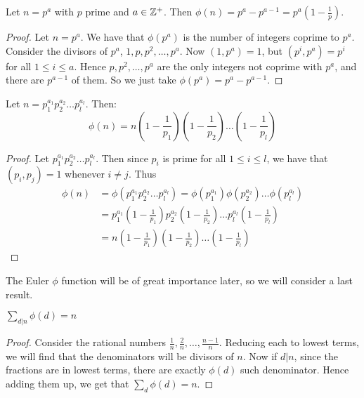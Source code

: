 \begin{lemma}\label{lemma2.2.16}
    Let $n=p^a$ with $p$ prime and $a \in \mathbb{Z}^+$. Then $\phi(n)=p^a-p^{a-1}=p^a(1-\frac{1}{p})$.
\end{lemma}
\begin{proof}
    Let $n=p^a$. We have that $\phi(p^a)$ is the number of integers coprime to $p^a$. Consider the divisors of $p^a$, $1,p,p^2, \dots, p^a$. Now $(1,p^a)=1$, but $(p^i,p^a)=p^i$ for all $1 \leq i \leq a$. Hence $p,p^2, \dots, p^a$ are the only integers not coprime with $p^a$, and there are $p^{a-1}$ of them. So we just take $\phi(p^a)=p^a-p^{a-1}$.
\end{proof}

\begin{proposition}\label{proposition2.2.17}
    Let $n=p_1^{a_1}p_2^{a_2} \dots p_l^{a_l}$. Then:
        \begin{equation}
            \phi(n)=n(1-\frac{1}{p_1})(1-\frac{1}{p_2}) \dots (1-\frac{1}{p_l})
        \end{equation}
\end{proposition}
\begin{proof}
    Let $p_1^{a_1}p_2^{a_2} \dots p_l^{a_l}$. Then since $p_i$ is prime for all $1 \leq i \leq l$, we have that $(p_i,p_j)=1$ whenever $i \neq j$. Thus
        \begin{align*}
            \phi(n) &= \phi(p_1^{a_1}p_2^{a_2} \dots p_l^{a_l})=\phi(p_1^{a_1})\phi(p_2^{a_2}) \dots \phi(p_l^{a_l}) \\
                    &= p_1^{a_1}(1-\frac{1}{p_1})p_2^{a_2}(1-\frac{1}{p_2}) \dots p_l^{a_l}(1-\frac{1}{p_l}) \\
                    &=n(1-\frac{1}{p_1})(1-\frac{1}{p_2}) \dots (1-\frac{1}{p_l})
        \end{align*}
\end{proof}

The Euler $\phi$ function will be of great importance later, so we will consider a last result.

\begin{proposition}\label{proposition2.2.18}
    $\sum_{d|n} \phi(d)=n$
\end{proposition}
\begin{proof}
    Consider the rational numbers $\frac{1}{n},\frac{2}{n}, \dots, \frac{n-1}{n}$. Reducing each to lowest terms, we will find that the denominators will be divisors of $n$. Now if $d|n$, since the fractions are in lowest terms, there are exactly $\phi(d)$ such denominator. Hence adding them up, we get that $\sum_{d} \phi(d)=n$.
\end{proof}



